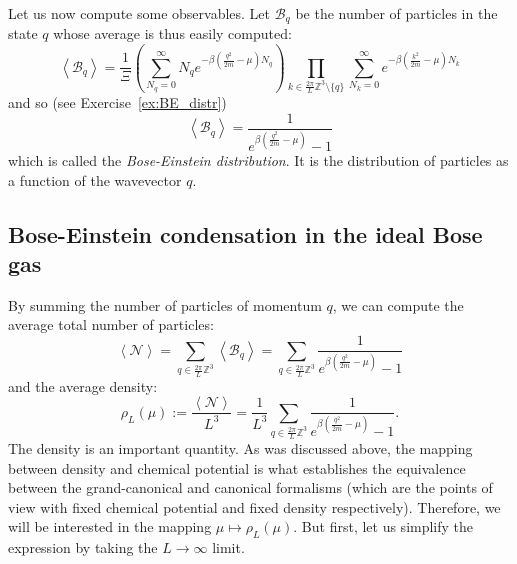 \documentclass{ian}
\begin{document}
\indent
Let us now compute some observables.
Let $\mathcal B_q$ be the number of particles in the state $q$ whose average is thus easily computed:
\begin{equation}
  \left<\mathcal B_q\right>=
  \frac1\Xi
  \left(
    \sum_{N_q=0}^\infty
    N_qe^{-\beta(\frac{q^2}{2m}-\mu)N_q}
  \right)
  \prod_{k\in\frac{2\pi}L\mathbb Z^3\setminus\{q\}}
  \sum_{N_k=0}^\infty
  e^{-\beta(\frac{k^2}{2m}-\mu)N_k}
  \label{BE_pre}
\end{equation}
and so (see Exercise\-~\ref{ex:BE_distr})
\begin{equation}
  \left<\mathcal B_q\right>=
  \frac1{e^{\beta(\frac{q^2}{2m}-\mu)}-1}
  \label{BE}
\end{equation}
which is called the {\it Bose-Einstein distribution}.
It is the distribution of particles as a function of the wavevector $q$.

\subsection{Bose-Einstein condensation in the ideal Bose gas}
\indent
By summing the number of particles of momentum $q$, we can compute the average total number of particles:
\begin{equation}
  \left<\mathcal N\right>
  =\sum_{q\in\frac{2\pi}L\mathbb Z^3}\left<\mathcal B_q\right>
  =\sum_{q\in\frac{2\pi}L\mathbb Z^3}
  \frac1{e^{\beta(\frac{q^2}{2m}-\mu)}-1}
\end{equation}
and the average density:
\begin{equation}
  \rho_L(\mu):=\frac{\left<\mathcal N\right>}{L^3}
  =
  \frac1{L^3}
  \sum_{q\in\frac{2\pi}L\mathbb Z^3}
  \frac1{e^{\beta(\frac{q^2}{2m}-\mu)}-1}
  .
  \label{rhomu_pre}
\end{equation}
The density is an important quantity.
As was discussed above, the mapping between density and chemical potential is what establishes the equivalence between the grand-canonical and canonical formalisms (which are the points of view with fixed chemical potential and fixed density respectively).
Therefore, we will be interested in the mapping $\mu\mapsto\rho_L(\mu)$.
But first, let us simplify the expression by taking the $L\to\infty$ limit.
\bigskip
\end{document}
